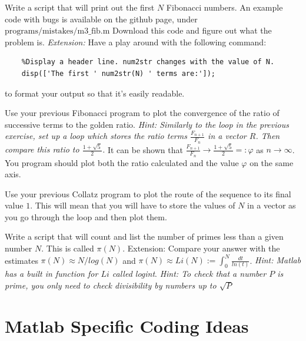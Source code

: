 \documentclass[12pt]{report}
\begin{document}
\begin{tcolorbox}[title=Task]
	Write a script that will print out the first $N$ Fibonacci numbers. An example code with bugs is available on the github page, under $\text{programs/mistakes/m3\_fib.m}$ Download this code and figure out what the problem is.
	\tcblower
	\textit{Extension:} Have a play around with the following command:
	\begin{lstlisting}
	%Display a header line. num2str changes with the value of N.
	disp(['The first ' num2str(N) ' terms are:']);
	\end{lstlisting}
	
	to format your output so that it's easily readable.
\end{tcolorbox}

\begin{tcolorbox}[title=Task]
  Use your previous Fibonacci program to plot the convergence of the ratio of successive terms to the golden ratio. \textit{Hint: Similarly to the loop in the previous exercise, set up a loop which stores the ratio terms $\frac{F_{n+1}}{F_{n}}$ in a vector $R$. Then compare this ratio to $\frac{1 + \sqrt{5}}{2}$.}
  \tcblower
  It can be shown that $\frac{F_{n+1}}{F_{n}} \to \frac{1 + \sqrt{5}}{2} =: \varphi$ as $n \to \infty$. You program should plot both the ratio calculated and the value $\varphi$ on the same axis.
\end{tcolorbox}

\begin{tcolorbox}[title=Task]
  Use your previous Collatz program to plot the route of the sequence to its final value $1$.
  \tcblower
  This will mean that you will have to store the values of $N$ in a vector as you go through the loop and then plot them.
\end{tcolorbox}

\begin{tcolorbox}[title=Task - Difficult]
  Write a script that will count and list the number of primes less than a given number $N$. This is called $\pi(N)$.
  \tcblower
  Extension: Compare your answer with the estimates $\pi(N) \approx N/log(N)$ and $\pi(N) \approx Li(N) := \int_0^N \frac{dt}{ln(t)}$. \textit{Hint: Matlab has a built in function for $Li$ called logint}. \textit{Hint: To check that a number $P$ is prime, you only need to check divisibility by numbers up to $\sqrt{P}$}
\end{tcolorbox}

\clearpage

\section*{Matlab Specific Coding Ideas}
\end{document}
